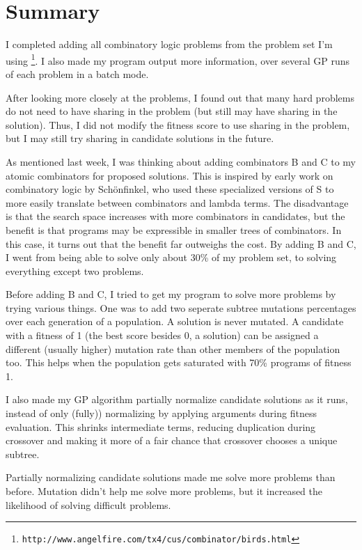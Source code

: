 \documentclass{article}
\begin{document}
\maketitle

\section{Summary}


I completed adding all combinatory logic problems from the problem set
I'm using
\footnote{\texttt{http://www.angelfire.com/tx4/cus/combinator/birds.html}}.
I also made my program output more information, over several GP runs
of each problem in a batch mode.

After looking more closely at the problems, I found out that many hard
problems do not need to have sharing in the problem (but still may
have sharing in the solution). Thus, I did not modify the fitness
score to use sharing in the problem, but I may still try sharing in
candidate solutions in the future.

As mentioned last week, I was thinking about adding combinators B and
C to my atomic combinators for proposed solutions. This is inspired by
early work on combinatory logic by Sch{\"o}nfinkel, who used these
specialized versions of S to more easily translate between combinators
and lambda terms. The disadvantage is that the search space increases
with more combinators in candidates, but the benefit is that programs
may be expressible in smaller trees of combinators. In this case, it
turns out that the benefit far outweighs the cost. By adding B and C,
I went from being able to solve only about 30\% of my problem set, to
solving everything except two problems.

Before adding B and C, I tried to get my program to solve more
problems by trying various things. One was to add two seperate
subtree mutations percentages over each generation of a population. A
solution is never mutated. A candidate with a fitness of 1 (the best
score besides 0, a solution) can be assigned a different (usually
higher) mutation rate than other members of the population too. This helps
when the population gets saturated with 70\% programs of fitness 1.

I also made my GP algorithm partially normalize candidate solutions as
it runs, instead of only (fully)) normalizing by applying arguments
during fitness evaluation. This shrinks intermediate terms, reducing
duplication during crossover and making it more of a fair chance that
crossover chooses a unique subtree.

Partially normalizing candidate solutions made me solve more problems
than before. Mutation didn't help me solve more problems, but it increased
the likelihood of solving difficult problems.
\end{document}
